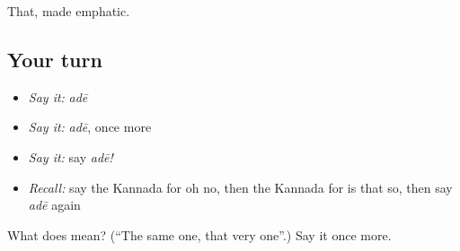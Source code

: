 \begin{grammarlens}[title={What you've built}]
That, made emphatic.
\end{grammarlens}

\subsection*{Your turn}
\begin{itemize}
\raggedright
  \item \emph{Say it:} \emph{adē}
  \item \emph{Say it:} \emph{adē}, once more
  \item \emph{Say it:} say \emph{adē!}
  \item \emph{Recall:} say the Kannada for oh no, then the Kannada for is that so, then say \emph{adē} again
\end{itemize}

\begin{tcolorbox}[breakable,colback=teal!4,colframe=teal!35!black,title={Before you move on}]
What does  mean? (\textquotedblleft{}The same one, that very one\textquotedblright{}.) Say it once more.
\end{tcolorbox}
